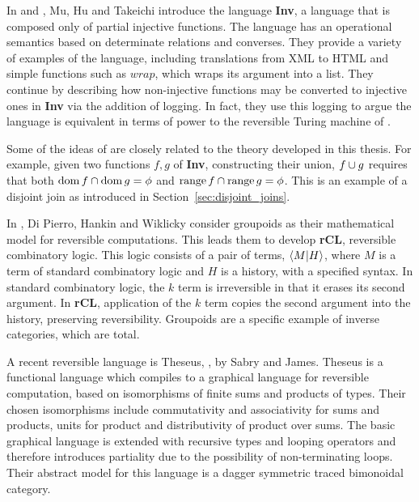 In \cite{mu06bidirectional} and \cite{muetal04:injreversible}, Mu, Hu and Takeichi introduce the language
\textbf{Inv}, a language that is composed only of partial injective functions. The language has an
operational semantics based on determinate relations and converses. They provide a variety of examples of the
language, including translations from XML to HTML and simple functions such as $wrap$, which wraps
its argument into a list. They continue by describing how non-injective functions may be converted to
injective ones in \textbf{Inv} via the addition of logging. In fact, they use this logging to argue
the language is equivalent in terms of power to the reversible Turing machine of
\cite{bennett:1973reverse}.

Some of the ideas of \cite{mu06bidirectional,muetal04:injreversible} are closely related to
the theory developed in this thesis. For example,  given two functions $f,g$ of \textbf{Inv},
constructing their union, $f\cup g$ requires that both $\operatorname*{dom} f \cap \operatorname*{dom} g = \phi$
and $\operatorname*{range} f \cap \operatorname*{range} g = \phi$. This is an example of a disjoint join as introduced in
Section~\ref{sec:disjoint_joins}.

In \cite{DiPierro200625}, Di Pierro, Hankin and Wiklicky consider groupoids as their mathematical
model for reversible computations. This leads them to develop \textbf{rCL}, reversible combinatory
logic. This logic consists of a pair of terms, $\langle M|H\rangle$, where $M$ is a term of standard combinatory
logic and $H$ is a history, with a specified syntax. In standard combinatory logic, the $k$ term is
irreversible in that it erases its second argument. In \textbf{rCL}, application of the $k$ term
copies the second argument into the history, preserving reversibility. Groupoids are a specific
example of inverse categories, which are total.

A recent reversible language is Theseus, \cite{james2014theseus}, by Sabry and James. Theseus is a
functional language which compiles to a graphical language
\cite{james2013isomorphic,james2012information} for reversible computation, based on
isomorphisms of finite sums and products of types. Their chosen isomorphisms include commutativity
and associativity for sums and products, units for product and distributivity of product over
sums. The basic graphical language is extended with recursive types and looping operators and
therefore introduces partiality due to the possibility of non-terminating loops. Their abstract
model for this language is a dagger symmetric traced bimonoidal category\cite{selinger05:dagger}.

